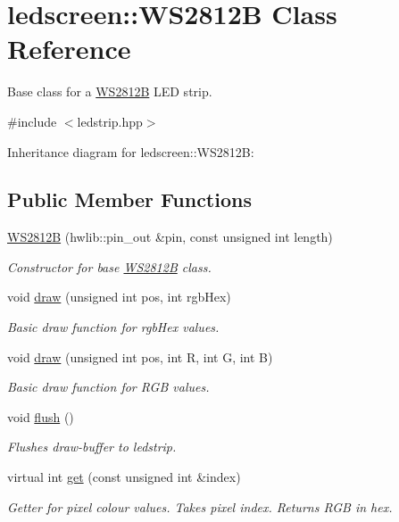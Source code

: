 \hypertarget{classledscreen_1_1WS2812B}{}\section{ledscreen\+:\+:W\+S2812B Class Reference}
\label{classledscreen_1_1WS2812B}


Base class for a \hyperlink{classledscreen_1_1WS2812B}{W\+S2812B} L\+ED strip.  




{\ttfamily \#include $<$ledstrip.\+hpp$>$}



Inheritance diagram for ledscreen\+:\+:W\+S2812B\+:
\subsection*{Public Member Functions}
\begin{DoxyCompactItemize}
\item 
\hyperlink{classledscreen_1_1WS2812B_aad8aa07db255de9439972e7e5689836d}{W\+S2812B} (hwlib\+::pin\+\_\+out \&pin, const unsigned int length)
\begin{DoxyCompactList}\small\item\em Constructor for base \hyperlink{classledscreen_1_1WS2812B}{W\+S2812B} class. \end{DoxyCompactList}\item 
void \hyperlink{classledscreen_1_1WS2812B_a6a2ebfd923258e9e23d278ff41d875bf}{draw} (unsigned int pos, int rgb\+Hex)
\begin{DoxyCompactList}\small\item\em Basic draw function for rgb\+Hex values. \end{DoxyCompactList}\item 
void \hyperlink{classledscreen_1_1WS2812B_a500df20b730204ccc9ab7a79bbf6b5d4}{draw} (unsigned int pos, int R, int G, int B)
\begin{DoxyCompactList}\small\item\em Basic draw function for R\+GB values. \end{DoxyCompactList}\item 
void \hyperlink{classledscreen_1_1WS2812B_ad30d0950ef865d72ebe2a0b0fe1399e2}{flush} ()
\begin{DoxyCompactList}\small\item\em Flushes draw-\/buffer to ledstrip. \end{DoxyCompactList}\item 
virtual int \hyperlink{classledscreen_1_1WS2812B_a79e2b0da57c6ff10a95de5751d97d342}{get} (const unsigned int \&index)
\begin{DoxyCompactList}\small\item\em Getter for pixel colour values. Takes pixel index. Returns R\+GB in hex. \end{DoxyCompactList}\end{DoxyCompactItemize}


